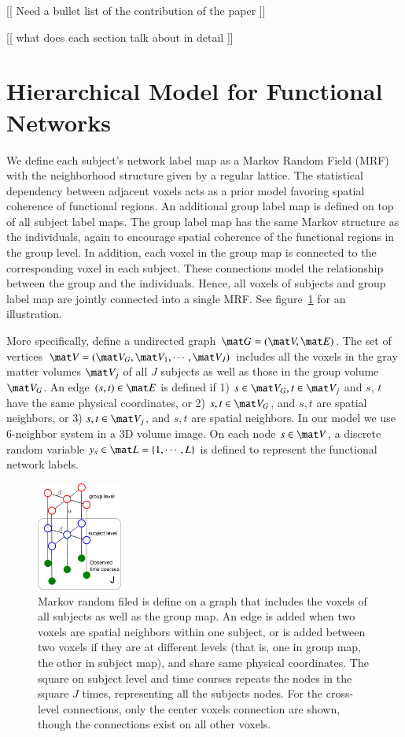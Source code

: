 \documentclass[final,authoryear,5p,twocolumn]{elsarticle}
\begin{document}
[[ Need a bullet list of the contribution of the paper ]]

[[ what does each section talk about in detail ]]

\section{Hierarchical Model for Functional Networks}
\label{sec:model}
We define each subject's network label map as a Markov Random Field (MRF) with
the neighborhood structure given by a regular lattice. The statistical
dependency between adjacent voxels acts as a prior model favoring spatial
coherence of functional regions. An additional group label map is defined on top
of all subject label maps. The group label map has the same Markov structure as
the individuals, again to encourage spatial coherence of the functional regions
in the group level. In addition, each voxel in the group map is connected to the
corresponding voxel in each subject. These connections model the relationship
between the group and the individuals. Hence, all voxels of subjects and group
label map are jointly connected into a single MRF. See
figure~\ref{fig:graphical} for an illustration.

More specifically, define a undirected graph $\mat G = (\mat V, \mat E)$. The
set of vertices $\mat V = (\mat V_G, \mat V_1, \cdots, \mat V_J)$ includes all
the voxels in the gray matter volumes $\mat V_j$ of all $J$ subjects as well as
those in the group volume $\mat V_G$.  An edge $(s, t) \in \mat E$ is defined if
1) $s\in \mat V_G, t\in \mat V_j$ and $s$, $t$ have the same physical
coordinates, or 2) $s, t\in \mat V_G$, and $s, t$ are spatial neighbors, or 3)
$s, t\in \mat V_j$, and $s, t$ are spatial neighbors. In our model we use
6-neighbor system in a 3D volume image. On each node $s \in \mat V$, a discrete
random variable $y_s \in \mat L = \{1,\cdots, L\}$ is defined to represent the
functional network labels.

\begin{figure}[htb]
  \centering
  \includegraphics[width=0.25\textwidth]{figures/graphical/grp2}
  \caption{Markov random filed is define on a graph that includes the voxels of
    all subjects as well as the group map. An edge is added when two voxels are
    spatial neighbors within one subject, or is added between two voxels if they
    are at different levels (that is, one in group map, the other in subject
    map), and share same physical coordinates. The square on subject level and
    time courses repeats the nodes in the square $J$ times, representing all the
    subjects nodes. For the cross-level connections, only the center voxels
    connection are shown, though the connections exist on all other voxels. }
  \label{fig:graphical}
\end{figure}
\end{document}
